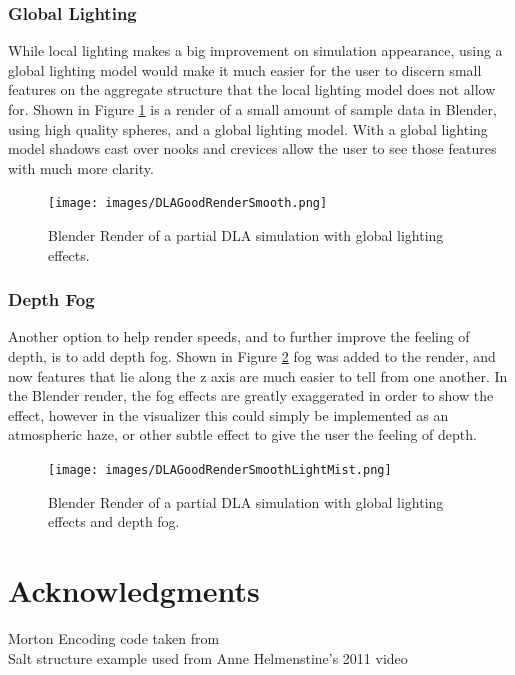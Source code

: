 \documentclass[fleqn,10pt]{UserGuideArx} %
\begin{document}
\subsubsection{Global Lighting}
While local lighting makes a big improvement on simulation appearance, using a global lighting model would make it much easier for the user to discern small features on the aggregate structure that the local lighting model does not allow for. Shown in Figure \ref{fig:GlobalLighting} is a render of a small amount of sample data in Blender, using high quality spheres, and a global lighting model. With a global lighting model shadows cast over nooks and crevices allow the user to see those features with much more clarity.

\begin{figure}[!ht]\centering %
    \texttt{[image: images/DLAGoodRenderSmooth.png]}
    \caption{Blender Render of a partial DLA simulation with global lighting effects.}
    \label{fig:GlobalLighting}
    \end{figure}

\subsubsection{Depth Fog}
Another option to help render speeds, and to further improve the feeling of depth, is to add depth fog. Shown in Figure \ref{fig:BlenderFog} fog was added to the render, and now features that lie along the z axis are much easier to tell from one another. In the Blender render, the fog effects are greatly exaggerated in order to show the effect, however in the visualizer this could simply be implemented as an atmospheric haze, or other subtle effect to give the user the feeling of depth.

\begin{figure}[!ht]\centering %
    \texttt{[image: images/DLAGoodRenderSmoothLightMist.png]}
    \caption{Blender Render of a partial DLA simulation with global lighting effects and depth fog.}
    \label{fig:BlenderFog}
    \end{figure}


\section*{Acknowledgments} %
Morton Encoding code taken from \cite{Karras:2012}\\
Salt structure example used from Anne Helmenstine's 2011 video \cite{Helmenstine:2011}



\end{document}
